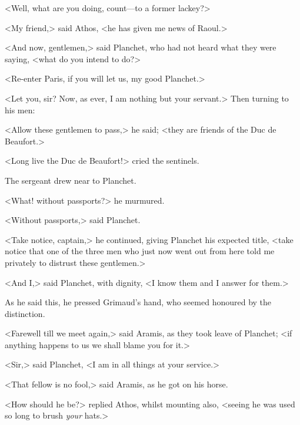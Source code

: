 <Well, what are you doing, count—to a former lackey?>

<My friend,> said Athos, <he has given me news of Raoul.>

<And now, gentlemen,> said Planchet, who had not heard what they were saying, <what do you intend to do?>

<Re-enter Paris, if you will let us, my good Planchet.>

<Let you, sir? Now, as ever, I am nothing but your servant.> Then turning to his men:

<Allow these gentlemen to pass,> he said; <they are friends of the Duc de Beaufort.>

<Long live the Duc de Beaufort!> cried the sentinels.

The sergeant drew near to Planchet.

<What! without passports?> he murmured.

<Without passports,> said Planchet.

<Take notice, captain,> he continued, giving Planchet his expected title, <take notice that one of the three men who just now went out from here told me privately to distrust these gentlemen.>

<And I,> said Planchet, with dignity, <I know them and I answer for them.>

As he said this, he pressed Grimaud's hand, who seemed honoured by the distinction.

<Farewell till we meet again,> said Aramis, as they took leave of Planchet; <if anything happens to us we shall blame you for it.>

<Sir,> said Planchet, <I am in all things at your service.>

<That fellow is no fool,> said Aramis, as he got on his horse.

<How should he be?> replied Athos, whilst mounting also, <seeing he was used so long to brush \textit{your} hats.> 